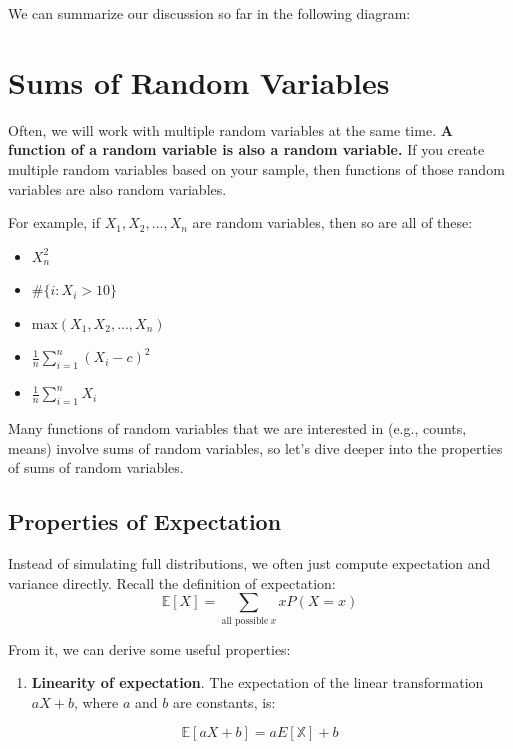 \documentclass[
  letterpaper,
  DIV=11,
  numbers=noendperiod]{scrreprt}
\providecommand{\tightlist}{%
  \setlength{\itemsep}{0pt}\setlength{\parskip}{0pt}}\usepackage{longtable,booktabs,array}
\begin{document}
We can summarize our discussion so far in the following diagram:

\section{Sums of Random Variables}\label{sums-of-random-variables}

Often, we will work with multiple random variables at the same time.
\textbf{A function of a random variable is also a random variable.} If
you create multiple random variables based on your sample, then
functions of those random variables are also random variables.

For example, if \(X_1, X_2, ..., X_n\) are random variables, then so are
all of these:

\begin{itemize}
\tightlist
\item
  \(X_n^2\)
\item
  \(\#\{i : X_i > 10\}\)
\item
  \(\text{max}(X_1, X_2, ..., X_n)\)
\item
  \(\frac{1}{n} \sum_{i=1}^n (X_i - c)^2\)
\item
  \(\frac{1}{n} \sum_{i=1}^n X_i\)
\end{itemize}

Many functions of random variables that we are interested in (e.g.,
counts, means) involve sums of random variables, so let's dive deeper
into the properties of sums of random variables.

\subsection{Properties of Expectation}\label{properties-of-expectation}

Instead of simulating full distributions, we often just compute
expectation and variance directly. Recall the definition of expectation:
\[\mathbb{E}[X] = \sum_{\text{all possible}\ x} x P(X=x)\]

From it, we can derive some useful properties:

\begin{enumerate}
\def\labelenumi{\arabic{enumi}.}
\tightlist
\item
  \textbf{Linearity of expectation}. The expectation of the linear
  transformation \(aX+b\), where \(a\) and \(b\) are constants, is:
\end{enumerate}

\[\mathbb{E}[aX+b] = aE[\mathbb{X}] + b\]
\end{document}
